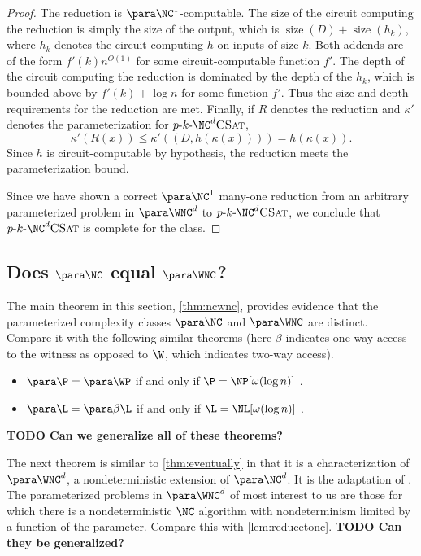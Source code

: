 \documentclass{article}
\newcommand{\todo}[1]{\textbf{TODO #1}}
\newcommand{\dash}{\textnormal{-}}
\newcommand{\pNCSAT}{p \dash k \dash \NC^d \textsc{CSat}}
\DeclareMathOperator{\size}{size}
\begin{document}
\begin{proof}
  The reduction is $\para \NC^1$-computable.
  The size of the circuit computing the reduction is simply the size of the output, which is $\size(D) + \size(h_k)$, where $h_k$ denotes the circuit computing $h$ on inputs of size $k$.
  Both addends are of the form $f'(k) n^{O(1)}$ for some circuit-computable function $f'$.
  The depth of the circuit computing the reduction is dominated by the depth of the $h_k$, which is bounded above by $f'(k) + \log n$ for some function $f'$.
  Thus the size and depth requirements for the reduction are met.
  Finally, if $R$ denotes the reduction and $\kappa'$ denotes the parameterization for $\pNCSAT$,
  \[
  \kappa'(R(x)) \leq \kappa'((D, h(\kappa(x)))) = h(\kappa(x)).
  \]
  Since $h$ is circuit-computable by hypothesis, the reduction meets the parameterization bound.

  Since we have shown a correct $\para \NC^1$ many-one reduction from an arbitrary parameterized problem in $\para \WNC^d$ to $\pNCSAT$, we conclude that $\pNCSAT$ is complete for the class.
\end{proof}

\subsection{Does \texorpdfstring{$\para \NC$}{paraNC} equal \texorpdfstring{$\para \WNC$}{paraWNC}?}
\label{sec:fppwpp}

The main theorem in this section, \autoref{thm:ncwnc}, provides evidence that the parameterized complexity classes $\para \NC$ and $\para \WNC$ are distinct.
Compare it with the following similar theorems (here $\beta$ indicates one-way access to the witness as opposed to $\W$, which indicates two-way access).
\begin{itemize}
\item $\para \P = \para \WP$ if and only if $\P = \NP[\omega(\log n)]$ \autocite[Theorem~3.29]{fg06}.
\item $\para \L = \para \beta \L$ if and only if $\L = \NL[\omega(\log n)]$ \autocite[Theorem~15]{cm14}.
\end{itemize}
\todo{Can we generalize all of these theorems?}

The next theorem is similar to \autoref{thm:eventually} in that it is a characterization of $\para \WNC^d$, a nondeterministic extension of $\para \NC^d$.
It is the adaptation of \autocite[Proposition~3.7]{fg06}.
The parameterized problems in $\para \WNC^d$ of most interest to us are those for which there is a nondeterministic $\NC$ algorithm with nondeterminism limited by a function of the parameter.
Compare this with \autoref{lem:reducetonc}.
\todo{Can they be generalized?}
\end{document}
